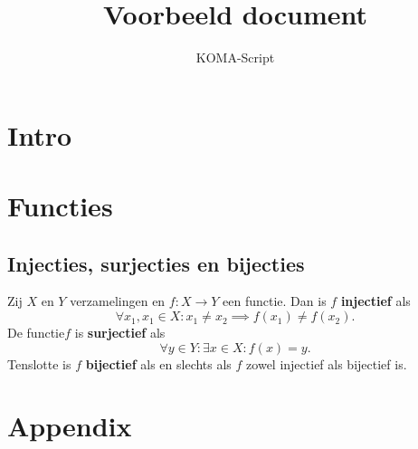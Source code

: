 \documentclass[
    a4paper,
    twoside,
    usegeometry,
    fontsize=10pt,
]{scrreprt}
\title{Voorbeeld document}
\subtitle{KOMA-Script}
\begin{document}
    \maketitle
    \tableofcontents


    \chapter*{Intro}
    \lipsum[1]


    \chapter{Functies}
    \lipsum[2]

    \lipsum[3]

    \section{Injecties, surjecties en bijecties}
    Zij $X$ en $Y$ verzamelingen en $f: X \to Y$ een functie.
    Dan is $f$ \textbf{injectief} als
    \[
        \forall x_1,x_1 \in X: x_1 \neq x_2 \implies f(x_1) \neq f(x_2).
    \]
    De functie$f$ is \textbf{surjectief} als
    \[
        \forall y \in Y: \exists x \in X: f(x) = y.
    \]
    Tenslotte is $f$ \textbf{bijectief} als en slechts als $f$ zowel injectief als bijectief is.


    \chapter*{Appendix}
    \lipsum[4]

    \nocite{*}
    \printbibliography
\end{document}
